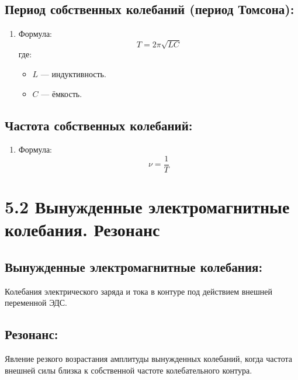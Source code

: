 \documentclass[a4paper,12pt]{article}
\begin{document}
\vspace{-9pt}
\subsection*{Период собственных колебаний (период Томсона):}
\vspace{-3pt}
\begin{enumerate}[itemsep=0pt, topsep=0pt, parsep=3pt]
  \item Формула:
  \vspace{-0.05em}
  $$ T = 2\pi \sqrt{LC} $$
  где:
  \begin{itemize}
    \item $L$ — индуктивность.
    \item $C$ — ёмкость.
  \end{itemize}
\end{enumerate}

\vspace{-9pt}
\subsection*{Частота собственных колебаний:}
\vspace{-3pt}
\begin{enumerate}[itemsep=0pt, topsep=0pt, parsep=3pt]
  \item Формула:
  \vspace{-0.05em}
  $$ \nu = \frac{1}{T} $$
\end{enumerate}


\section*{5.2 Вынужденные электромагнитные колебания. Резонанс}
\vspace{-9pt}
\subsection*{Вынужденные электромагнитные колебания:}
\vspace{-3pt}
Колебания электрического заряда и тока в контуре под действием внешней переменной ЭДС.

\vspace{-9pt}
\subsection*{Резонанс:}
\vspace{-3pt}
Явление резкого возрастания амплитуды вынужденных колебаний, когда частота внешней силы близка к собственной частоте колебательного контура.
\end{document}
